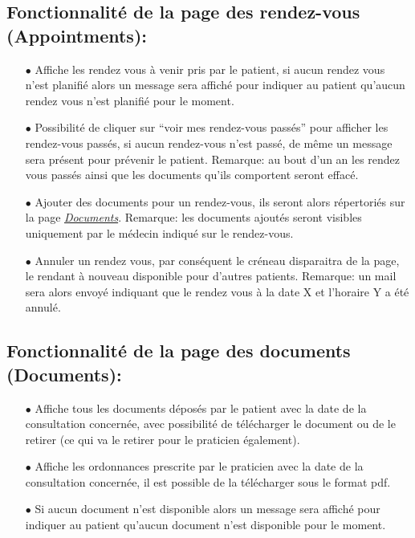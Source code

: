 \documentclass[a4paper]{report}
\begin{document}
\subsection{Fonctionnalité de la page des rendez-vous (Appointments):}\label{appointments}
    \begin{itemize}
        \item[$\bullet$] Affiche les rendez vous à venir pris par le patient, si aucun rendez vous n’est planifié alors un message sera affiché pour indiquer au patient qu’aucun rendez vous n’est planifié pour le moment.
        \item[$\bullet$] Possibilité de cliquer sur “voir mes rendez-vous passés” pour afficher les rendez-vous passés, si aucun rendez-vous n’est passé, de même un message sera présent pour prévenir le patient. {\fontsize{8}{14}\selectfont Remarque: au bout d’un an les rendez vous passés ainsi que les documents qu’ils comportent seront effacé}.
        \item[$\bullet$] Ajouter des documents pour un rendez-vous, ils seront alors répertoriés sur la page \textit{\hyperref[documents]{Documents}}. {\fontsize{8}{14}\selectfont Remarque: les documents ajoutés seront visibles uniquement par le médecin indiqué sur le rendez-vous}.
        \item[$\bullet$] Annuler un rendez vous, par conséquent le créneau disparaitra de la page, le rendant à nouveau disponible pour d’autres patients. {\fontsize{8}{14}\selectfont Remarque: un mail sera alors envoyé indiquant que le rendez vous à la date X et l’horaire Y a été annulé}.
    \end{itemize}
    \vspace{3mm}

\subsection{Fonctionnalité de la page des documents (Documents):}\label{documents}
    \begin{itemize}
        \item[$\bullet$] Affiche tous les documents déposés par le patient avec la date de la consultation concernée, avec possibilité de télécharger le document ou de le retirer (ce qui va le retirer pour le praticien également).
        \item[$\bullet$] Affiche les ordonnances prescrite par le praticien avec la date de la consultation concernée, il est possible de la télécharger sous le format pdf.
        \item[$\bullet$] Si aucun document n’est disponible alors un message sera affiché pour indiquer au patient qu’aucun document n’est disponible pour le moment.
    \end{itemize}
    \vspace{3mm}
\end{document}
